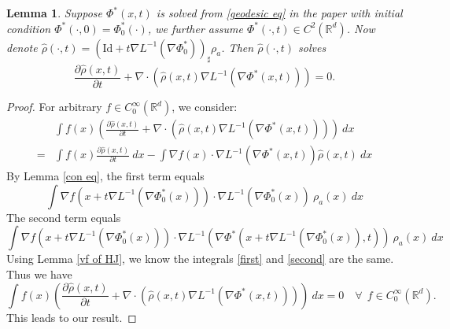 \documentclass{article}
\newtheorem{lemma}{Lemma}
\begin{document}


\begin{lemma}\label{continuity eq lemma}
   Suppose $\Phi^*(x,t)$ is solved from \eqref{geodesic eq} in the paper with initial condition $\Phi^*(\cdot, 0) = \Phi^*_0(\cdot)$, we further assume $\Phi^*(\cdot, t)\in C^2(\mathbb{R}^d)$. Now denote $\hat{\rho}(\cdot, t) = (\textrm{Id}+t\nabla L^{-1}(\nabla \Phi^*_0))_{\sharp}\rho_a$. Then $\hat{\rho}(\cdot, t)$ solves 
   \begin{equation*}
      \frac{\partial \hat{\rho}(x,t)}{\partial t} + \nabla\cdot(\hat{\rho}(x,t)\nabla L^{-1}(\nabla\Phi^*(x,t)))=0.
   \end{equation*}
\end{lemma}
\begin{proof}
  For arbitrary $f\in C_0^\infty(\mathbb{R}^d)$, we consider:
  \begin{align*}
    & \int f(x)\left(\frac{\partial \hat{\rho}(x,t)}{\partial t} + \nabla\cdot(\hat{\rho}(x,t)\nabla L^{-1}(\nabla\Phi^*(x,t)))\right)~dx \\
    =& \int f(x)\frac{\partial\hat{\rho}(x,t)}{\partial t} ~dx -\int \nabla f(x)\cdot \nabla L^{-1}(\nabla\Phi^*(x,t))\hat{\rho}(x,t)~dx
  \end{align*}
  By Lemma \ref{con eq}, the first term equals
  \begin{equation}
   \int \nabla f(x+t\nabla L^{-1}(\nabla\Phi^*_0(x)))\cdot \nabla L^{-1}(\nabla\Phi^*_0(x))~\rho_a(x)~dx  \label{first}
  \end{equation}
  The second term equals
  \begin{equation}
    \int \nabla f(x+t\nabla L^{-1}(\nabla\Phi^*_0(x)))\cdot \nabla L^{-1}(\nabla\Phi^*(x+t\nabla L^{-1}(\nabla\Phi^*_0(x)), t))~\rho_a(x)~ dx\label{second}
  \end{equation}
  Using Lemma \ref{vf of HJ}, we know the integrals \eqref{first} and \eqref{second} are the same. Thus we have
  \begin{equation*}
     \int f(x)\left(\frac{\partial \hat{\rho}(x,t)}{\partial t} + \nabla\cdot(\hat{\rho}(x,t)\nabla L^{-1}(\nabla\Phi^*(x,t)))\right)~dx = 0 \quad \forall ~ ~f\in C_0^\infty(\mathbb{R}^d).
  \end{equation*}
  This leads to our result.
\end{proof}
\end{document}
